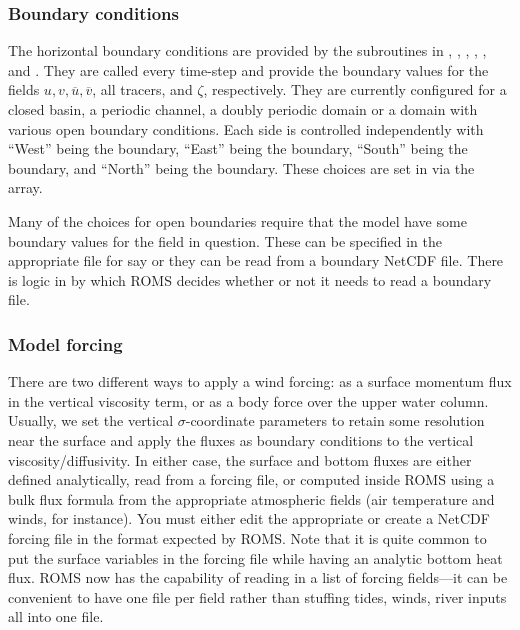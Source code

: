 \subsubsection{Boundary conditions}
\label{Bcs}
The horizontal boundary conditions are provided by the subroutines
in , , , ,
, and .  They are called every time-step
and provide the boundary values for the fields $u, v, \overline{u},
\overline{v}$, all tracers, and $\zeta$, respectively. They are currently
configured for a closed basin, a periodic channel, a doubly periodic
domain or a domain with various open boundary conditions. Each side is
controlled independently with ``West'' being the  boundary,
``East'' being the  boundary, ``South'' being the 
boundary, and ``North'' being the  boundary. These choices are
set in  via the  array.

Many of the choices for open boundaries require that the model have
some boundary values for the field in question. These can be specified in
the appropriate  file for say  or
they can be read from a boundary NetCDF file. There is logic in
 by which ROMS decides whether or not it needs to
read a boundary file.

\subsubsection{Model forcing}
\label{Mforce}

There are two different ways to apply a wind forcing: as a surface
momentum flux in the vertical viscosity term, or as a body force over
the upper water column.
Usually, we set the vertical $\sigma$-coordinate
parameters to retain some resolution near the surface and apply the
fluxes as boundary conditions to the vertical viscosity/diffusivity.
In either case, the surface and bottom fluxes are either defined
analytically, read from a forcing file, or computed inside ROMS
using a bulk flux formula from the appropriate atmospheric fields
(air temperature and winds, for instance).  You must either edit the
appropriate  or create a NetCDF forcing
file in the format expected by ROMS. Note that it is quite common
to put the surface variables in the forcing file while having an analytic
bottom heat flux. ROMS now has the capability of reading in a list
of forcing fields---it can be convenient to have one file per field
rather than stuffing tides, winds, river inputs all into one file.

